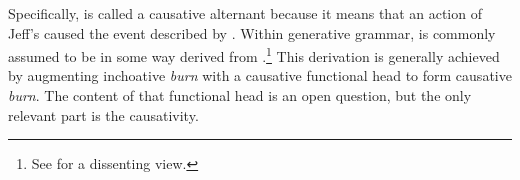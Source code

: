 \documentclass[MilwayThesis]{subfiles}
\begin{document}
Specifically, \Last[b] is called a causative alternant because it means that an action of Jeff's caused the event described by \Last[b].
Within generative grammar, \Last[b] is commonly assumed to be in some way derived from \Last[a].\footnote{
  See \textcite{fodor1970three} for a dissenting view.
}
This derivation is generally achieved by augmenting inchoative \textit{burn} with a causative functional head to form causative \textit{burn}.
The content of that functional head is an open question, but the only relevant part is the causativity.
\end{document}
